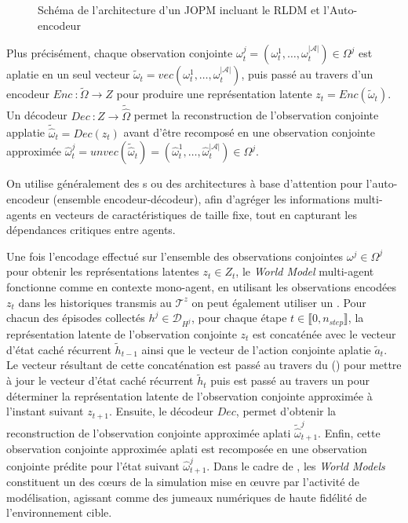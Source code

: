\begin{figure}[h]
  \centering
  \resizebox{\textwidth}{!}{%
    
  }
  \caption{Schéma de l'architecture d'un JOPM incluant le RLDM et l'Auto-encodeur}
  \label{fig:jopm_architecture}
\end{figure}


Plus précisément, chaque observation conjointe $\omega_t^{j} = (\omega_t^1, \dots, \omega_t^{|\mathcal{A}|}) \in \Omega^{j}$ est aplatie en un seul vecteur $\tilde{\omega}_t = vec(\omega_t^1, \dots, \omega_t^{|\mathcal{A}|})$, puis passé au travers d'un encodeur $Enc~: \tilde{\Omega}\rightarrow Z$ pour produire une représentation latente $z_t = Enc(\tilde{\omega}_t)$. Un décodeur $Dec~: Z \rightarrow \widetilde{\hat{\Omega}}$ permet la reconstruction de l'observation conjointe applatie $\widetilde{\hat{\omega}}_t = Dec(z_t)$ avant d'être recomposé en une observation conjointe approximée $\hat{\omega}_t^{j} = unvec(\widetilde{\hat{\omega}}_t) = (\hat{\omega}_t^1, \dots, \hat{\omega}_t^{|\mathcal{A}|}) \in \Omega^{j}$.

On utilise généralement des s ou des architectures à base d'attention pour l'auto-encodeur (ensemble encodeur-décodeur), afin d'agréger les informations multi-agents en vecteurs de caractéristiques de taille fixe, tout en capturant les dépendances critiques entre agents.

Une fois l'encodage effectué sur l'ensemble des observations conjointes $\omega^j \in \Omega^{j}$ pour obtenir les représentations latentes $z_t \in Z_t$, le \textit{World Model} multi-agent fonctionne comme en contexte mono-agent, en utilisant les observations encodées $z_t$ dans les historiques transmis au  $\mathcal{T}^{z}$ on peut également utiliser un . Pour chacun des épisodes collectés $h^j \in \mathcal{D}_{H^j}$, pour chaque étape $t \in \llbracket 0, n_{step} \rrbracket$, la représentation latente de l'observation conjointe $z_t$ est concaténée avec le vecteur d'état caché récurrent $\tilde{h}_{t-1}$ ainsi que le vecteur de l'action conjointe aplatie $\tilde{a}_t$. Le vecteur résultant de cette concaténation est passé au travers du  () pour mettre à jour le vecteur d'état caché récurrent $\tilde{h}_{t}$ puis est passé au travers un  pour déterminer la représentation latente de l'observation conjointe approximée à l'instant suivant $z_{t+1}$. Ensuite, le décodeur $Dec$, permet d'obtenir la reconstruction de l'observation conjointe approximée aplati $\tilde{\hat{\omega}}_{t+1}^{j}$. Enfin, cette observation conjointe approximée aplati est recomposée en une observation conjointe prédite pour l'état suivant $\hat{\omega}_{t+1}^{j}$. Dans le cadre de , les \textit{World Models} constituent un des cœurs de la simulation mise en œuvre par l'activité de modélisation, agissant comme des jumeaux numériques de haute fidélité de l'environnement cible.

